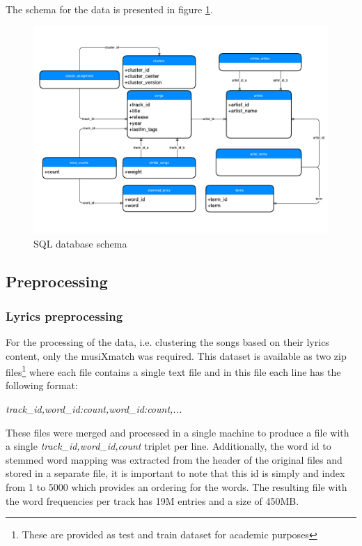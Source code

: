 \documentclass[11pt,a4paper]{scrartcl}
\begin{document}
    The schema for the data is presented in figure \ref{fig:data_schema}.
 
    \begin{figure}
      \centering
      \includegraphics[scale=0.6]{img/database}
      \caption{SQL database schema}
      \label{fig:data_schema}
    \end{figure}        

    \subsection{Preprocessing}
    \subsubsection{Lyrics preprocessing}
    \label{sec:preprocessing}

    For the processing of the data, i.e. clustering the songs based on their
    lyrics content, only the musiXmatch was required. This dataset is available
    as two zip files\footnote{These are provided as test and train dataset for
    academic purposes} where each file contains a single text file and in this
    file each line has the following format:
    
    \emph{track\_id,word\_id:count,word\_id:count,...}
    
    These files were merged and processed in a single machine to produce a file
    with a single 
    \emph{track\_id,word\_id,count} triplet per line. Additionally, the word id
    to stemmed word mapping was extracted from the header of the original files
    and stored in a separate file, it is important to note that this id is simply
    and index from 1 to 5000 which provides an ordering for the words.
    The resulting file with the word frequencies per track has 19M entries and a
    size of 450MB.
    
\end{document}
